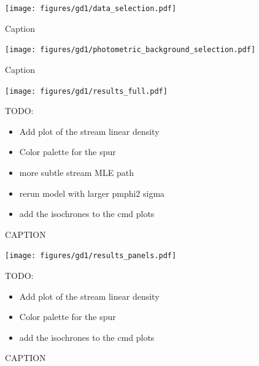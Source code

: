 \documentclass[twocolumn]{aastex631}
\begin{document}
            \begin{figure}[h]
                \centering
                \texttt{[image: figures/gd1/data\_selection.pdf]}
                \caption{Caption}
                \label{fig:gd1-data_selection}
            \end{figure}

            \begin{figure}
                \centering
                \texttt{[image: figures/gd1/photometric\_background\_selection.pdf]}
                \caption{Caption}
                \label{fig:gd1-photometric_background_selection}
            \end{figure}

            \begin{figure}[h]
                \centering
                \texttt{[image: figures/gd1/results\_full.pdf]}
                \caption{CAPTION}
                TODO:
                \begin{itemize}
                    \item Add plot of the stream linear density
                    \item Color palette for the spur
                    \item more subtle stream MLE path
                    \item rerun model with larger pmphi2 sigma
                    \item add the isochrones to the cmd plots
                \end{itemize}
                \label{fig:gd1-results-full}
            \end{figure}

            \begin{figure}[h]
                \centering
                \texttt{[image: figures/gd1/results\_panels.pdf]}
                \caption{CAPTION}
                TODO:
                \begin{itemize}
                    \item Add plot of the stream linear density
                    \item Color palette for the spur
                    \item add the isochrones to the cmd plots
                \end{itemize}
                \label{fig:gd1-results-panels}
            \end{figure}
    
\end{document}
